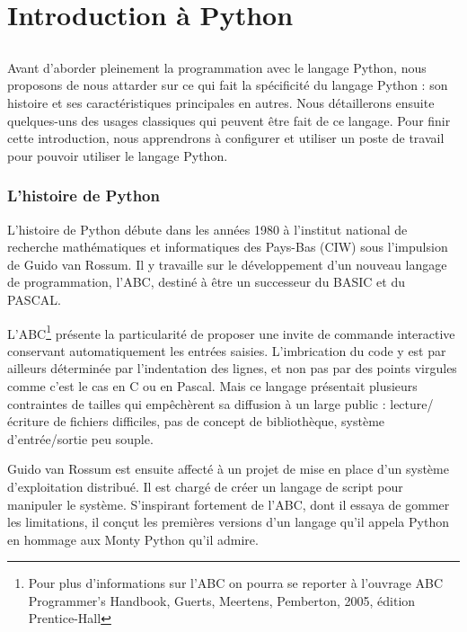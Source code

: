 \documentclass[12pt, a4paper]{article}
\begin{document}
\newpage
\part{Introduction à Python}
\chapter{}
Avant d'aborder pleinement la programmation avec le langage Python, nous proposons de nous attarder sur ce qui fait la spécificité du langage Python : son histoire et ses caractéristiques principales en autres. Nous détaillerons ensuite quelques-uns des usages classiques qui peuvent être fait de ce langage. Pour finir cette introduction, nous apprendrons à configurer et utiliser un poste de travail pour pouvoir utiliser le langage Python.



\section{L'histoire de Python}
L'histoire de Python débute dans les années 1980 à l'institut national de recherche mathématiques et informatiques des Pays-Bas (CIW) sous l'impulsion de Guido van Rossum. Il y travaille sur le développement d'un nouveau langage de programmation, l'ABC, destiné à être un successeur du BASIC et du PASCAL. 

L'ABC\footnote{Pour plus d'informations sur l'ABC on pourra se reporter à l'ouvrage ABC Programmer's Handbook, Guerts, Meertens, Pemberton, 2005, édition Prentice-Hall} présente la particularité de proposer une invite de commande interactive conservant automatiquement les entrées saisies. L'imbrication du code y est par ailleurs déterminée par l'indentation des lignes, et non pas par des points virgules comme c'est le cas en C ou en Pascal. Mais ce langage présentait plusieurs contraintes de tailles qui empêchèrent sa diffusion à un large public : lecture/écriture de fichiers difficiles, pas de concept de bibliothèque, système d'entrée/sortie peu souple.

Guido van Rossum est ensuite affecté à un projet de mise en place d'un système d'exploitation distribué. Il est chargé de créer un langage de script pour manipuler le système. S'inspirant fortement de l'ABC, dont il essaya de gommer les limitations, il conçut les premières versions d'un langage qu'il appela Python en hommage aux Monty Python qu'il admire.
\end{document}
